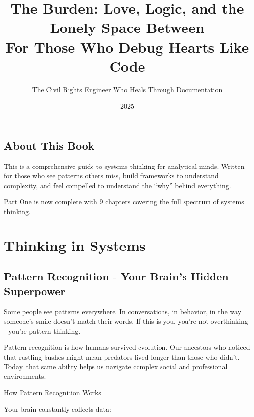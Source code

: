 \documentclass[11pt,oneside]{book}
\title{The Burden: Love, Logic, and the Lonely Space Between\\
\large For Those Who Debug Hearts Like Code}
\author{The Civil Rights Engineer Who Heals Through Documentation}
\date{2025}
\begin{document}
\maketitle

\tableofcontents

\chapter*{About This Book}

This is a comprehensive guide to systems thinking for analytical minds. Written for those who see patterns others miss, build frameworks to understand complexity, and feel compelled to understand the ``why'' behind everything.

Part One is now complete with 9 chapters covering the full spectrum of systems thinking.

\part{Thinking in Systems}


\chapter{Pattern Recognition - Your Brain's Hidden Superpower}
Some people see patterns everywhere. In conversations, in behavior, in the way someone's smile doesn't match their words. If this is you, you're not overthinking - you're pattern thinking.

Pattern recognition is how humans survived evolution. Our ancestors who noticed that rustling bushes might mean predators lived longer than those who didn't. Today, that same ability helps us navigate complex social and professional environments.

How Pattern Recognition Works

Your brain constantly collects data:
\end{document}
